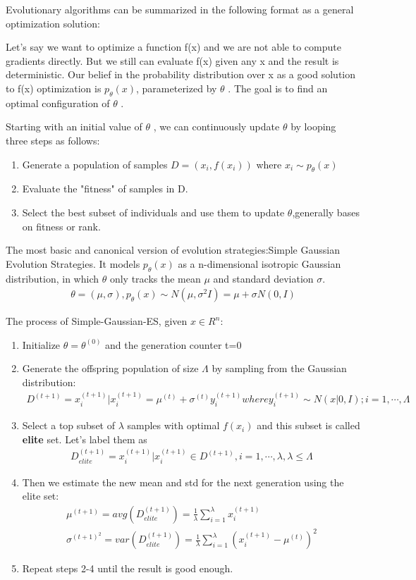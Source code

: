 \documentclass[12pt]{article}
\begin{document}
Evolutionary algorithms can be summarized in the following format as a general optimization solution:

Let's say we want to optimize a function f(x) and we are not able to 
compute gradients directly. But we still can evaluate f(x) given any x  
and the result is deterministic. Our belief in the probability 
distribution over x as a good solution to f(x) optimization is $p_\theta (x)$, 
parameterized by $\theta$ . 
The goal is to find an optimal configuration of $\theta$ .


Starting with an initial value of $\theta$ ,
 we can continuously update $\theta$ by looping three steps as follows:
\begin{enumerate}
	\item Generate a population of samples $D={(x_i,f(x_i))}$ where $x_i\sim p_\theta(x)$
	\item Evaluate the "fitness" of samples in D.
	\item Select the best subset of individuals and use them to update $\theta$,generally bases on fitness or rank. 
\end{enumerate}

The most basic and canonical version of evolution strategies:Simple Gaussian Evolution Strategies.
It models $p_\theta (x)$ as 
a n-dimensional isotropic Gaussian distribution, 
in which $\theta$ only tracks the mean $\mu$  and standard deviation $\sigma$.
\begin{align}
	\theta=(\mu,\sigma),p_\theta (x)\sim N(\mu,\sigma^2I)=\mu+\sigma N(0,I)
\end{align}

The process of  Simple-Gaussian-ES, given $x\in R^n$:

\begin{enumerate}
	\item Initialize $\theta=\theta^{(0)}$ and the generation counter t=0
	\item Generate the offspring population of size $\Lambda $
	by sampling from the Gaussian distribution:
	\begin{align}
		D^{(t+1)}={x_i^{(t+1)}|x_i^{(t+1)}=\mu^{(t)}+\sigma^{(t)}y_i^{(t+1)} where y_i^{(t+1)}\sim N(x|0,I);i=1,\cdots,\Lambda }
	\end{align}
	\item Select a top subset of $\lambda$  
	samples with optimal $f(x_i)$ and this subset is 
	called \textbf{elite} set. 
	Let's label them as
	\begin{align}
		D^{(t+1)}_{elite}=x_i^{(t+1)}|x_i^{(t+1)}\in D^{(t+1)},i=1,\cdots,\lambda,\lambda \leq \Lambda 
	\end{align}
	\item Then we estimate the new mean and std for the next generation using the elite set:
	\begin{gather}
		\mu^{(t+1)}=avg(D^{(t+1)}_{elite})=\frac{1}{\lambda}\sum_{i=1}^\lambda x_i^{(t+1)}\\
		\sigma^{(t+1)^2}=var(D^{(t+1)}_{elite})=\frac{1}{\lambda}\sum_{i=1}^\lambda (x_i^{(t+1)}-\mu^{(t)})^2
	\end{gather} 
	\item Repeat steps 2-4 until the result is good enough.
\end{enumerate}
\end{document}
